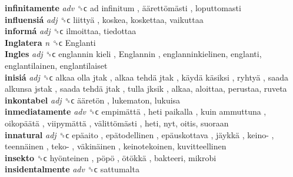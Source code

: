 \textbf{infinitamente} \emph{adv}  ␝ϲ   ad infinitum ,  äärettömästi , loputtomasti  \\
\textbf{influensiá} \emph{adj}  ␝ϲ   liittyä , koskea, koskettaa, vaikuttaa  \\
\textbf{informá} \emph{adj}  ␝ϲ  ilmoittaa, tiedottaa  \\
\textbf{Inglatera} \emph{n}  ␝ϲ   Englanti   \\
\textbf{Ingles} \emph{adj}  ␝ϲ   englannin kieli ,  Englannin , englanninkielinen, englanti, englantilainen, englantilaiset  \\
\textbf{inisiá} \emph{adj}  ␝ϲ   alkaa olla jtak ,  alkaa tehdä jtak ,  käydä käsiksi ,  ryhtyä ,  saada alkunsa jstak ,  saada tehdä jtak ,  tulla jksik , alkaa, aloittaa, perustaa, ruveta  \\
\textbf{inkontabel} \emph{adj}  ␝ϲ   ääretön , lukematon, lukuisa  \\
\textbf{inmediatamente} \emph{adv}  ␝ϲ   empimättä ,  heti paikalla ,  kuin ammuttuna ,  oikopäätä ,  viipymättä ,  välittömästi , heti, nyt, oitis, suoraan  \\
\textbf{innatural} \emph{adj}  ␝ϲ   epäaito ,  epätodellinen ,  epäuskottava ,  jäykkä ,  keino- ,  teennäinen ,  teko- ,  väkinäinen , keinotekoinen, kuvitteellinen  \\
\textbf{insekto} ␝ϲ   hyönteinen ,  pöpö ,  ötökkä , bakteeri, mikrobi  \\
\textbf{insidentalmente} \emph{adv}  ␝ϲ  sattumalta  \\
